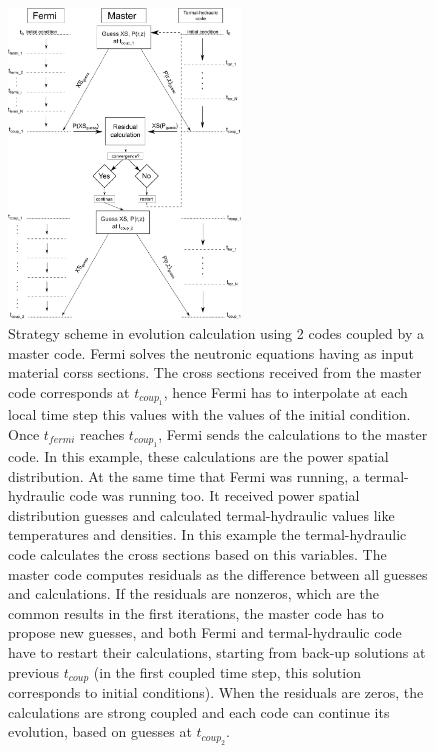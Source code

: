 \begin{figure}[ht]
  \centering
  \includegraphics[width=0.55\textwidth]{./images/coupling.pdf}
  \caption{Strategy scheme in evolution calculation using 2 codes coupled by a master code.
    Fermi solves the neutronic equations having as input material corss sections.
    The cross sections received from the master code corresponds at $t_{coup_1}$,
    hence Fermi has to interpolate at each local time step this values with the values of the initial condition.
    Once $t_{fermi}$ reaches $t_{coup_1}$, Fermi sends the calculations to the master code.
    In this example, these calculations are the power spatial distribution.
    At the same time that Fermi was running, a termal-hydraulic code was running too.
    It received power spatial distribution guesses and calculated termal-hydraulic values like temperatures and densities.
    In this example the termal-hydraulic code calculates the cross sections based on this variables.
    The master code computes residuals as the difference between all guesses and calculations.
    If the residuals are nonzeros, which are the common results in the first iterations, the master code has to propose new guesses,
    and both Fermi and termal-hydraulic code have to restart their calculations, starting from back-up solutions at previous $t_{coup}$
    (in the first coupled time step, this solution corresponds to initial conditions).
    When the residuals are zeros, the calculations are strong coupled and each code can continue its evolution, based on guesses at $t_{coup_2}$.
  }
  \label{couplingScheme}
\end{figure}

